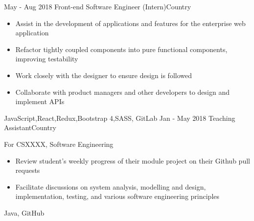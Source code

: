 %
%
%

\begin{experiences}
  \experience
    {May - Aug 2018}   {Front-end Software Engineer (Intern)}{}{Country}
    {} {
                      \begin{itemize}
                        \item Assist in the development of applications and features for the enterprise web application
                        \item Refactor tightly coupled components into pure functional components, improving testability
                        \item Work closely with the designer to ensure design is followed
                        \item Collaborate with product managers and other developers to design and implement APIs
                      \end{itemize}
                    }
                    {JavaScript,React,Redux,Bootstrap 4,SASS, GitLab}
  \emptySeparator
  \experience
    {Jan - May 2018} {Teaching Assistant}{}{Country}
    {}    {
                      For CSXXXX, Software Engineering
                      \begin{itemize}
                        \item Review student’s weekly progress of their module project on their Github pull requests
                        \item Facilitate discussions on system analysis, modelling and design, implementation, testing, and various software engineering principles
                      \end{itemize}
                    }
                    {Java, GitHub}
\end{experiences}
